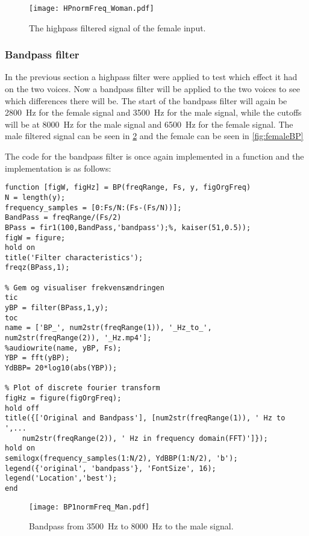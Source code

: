 \begin{figure}[h]
	\centering
	\texttt{[image: HPnormFreq\_Woman.pdf]}
	\caption{The highpass filtered signal of the female input.}
	\label{fig:HPFemale}
\end{figure}

\subsubsection{Bandpass filter}
\label{sec:Bandpass}
In the previous section a highpass filter were applied to test which effect it had on the two voices. Now a bandpass filter will be applied to the two voices to see which differences there will be. The start of the bandpass filter will again be \SI{2800}{\hertz} for the female signal and \SI{3500}{\hertz} for the male signal, while the cutoffs will be at \SI{8000}{\hertz} for the male signal and \SI{6500}{\hertz} for the female signal. The male filtered signal can be seen in \cref{fig:maleBP} and the female can be seen in \cref{fig:femaleBP}

The code for the bandpass filter is once again implemented in a function and the implementation is as follows:

\begin{verbatim}
function [figW, figHz] = BP(freqRange, Fs, y, figOrgFreq)
N = length(y);
frequency_samples = [0:Fs/N:(Fs-(Fs/N))];
BandPass = freqRange/(Fs/2)
BPass = fir1(100,BandPass,'bandpass');%, kaiser(51,0.5));
figW = figure;
hold on
title('Filter characteristics');
freqz(BPass,1);

% Gem og visualiser frekvensændringen
tic
yBP = filter(BPass,1,y);
toc
name = ['BP_', num2str(freqRange(1)), '_Hz_to_', num2str(freqRange(2)), '_Hz.mp4'];
%audiowrite(name, yBP, Fs);
YBP = fft(yBP);
YdBBP= 20*log10(abs(YBP));

% Plot of discrete fourier transform
figHz = figure(figOrgFreq);
hold off
title({['Original and Bandpass'], [num2str(freqRange(1)), ' Hz to ',...
	num2str(freqRange(2)), ' Hz in frequency domain(FFT)']});
hold on
semilogx(frequency_samples(1:N/2), YdBBP(1:N/2), 'b');
legend({'original', 'bandpass'}, 'FontSize', 16);
legend('Location','best');
end
\end{verbatim}

\begin{figure}[h]
	\centering
	\texttt{[image: BP1normFreq\_Man.pdf]}
	\caption{Bandpass from \SI{3500}{\hertz} to \SI{8000}{\hertz} to the male signal.}
	\label{fig:maleBP}
\end{figure}

